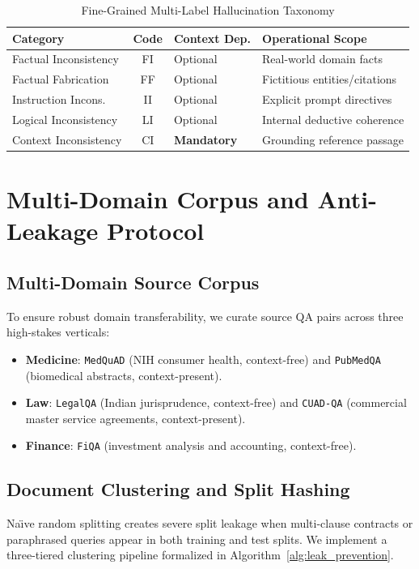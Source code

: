 \documentclass[conference]{IEEEtran}
\begin{document}
\begin{table}[!t]
\caption{Fine-Grained Multi-Label Hallucination Taxonomy}
\label{tab:taxonomy}
\centering
\footnotesize
\setlength{\tabcolsep}{3pt}
\renewcommand{\arraystretch}{1.15}
\begin{tabularx}{\columnwidth}{@{}lcLL@{}}
\toprule
\textbf{Category} & \textbf{Code} & \textbf{Context Dep.} & \textbf{Operational Scope} \\
\midrule
Factual Inconsistency & FI & Optional & Real-world domain facts \\
Factual Fabrication   & FF & Optional & Fictitious entities/citations \\
Instruction Incons.   & II & Optional & Explicit prompt directives \\
Logical Inconsistency & LI & Optional & Internal deductive coherence \\
Context Inconsistency & CI & \textbf{Mandatory} & Grounding reference passage \\
\bottomrule
\end{tabularx}
\end{table}

\section{Multi-Domain Corpus and Anti-Leakage Protocol}
\label{sec:corpus}

\subsection{Multi-Domain Source Corpus}
To ensure robust domain transferability, we curate source QA pairs across three high-stakes verticals:
\begin{itemize}
    \item \textbf{Medicine}: \texttt{MedQuAD} \cite{benabacha2019medquad} (NIH consumer health, context-free) and \texttt{PubMedQA} \cite{jin2019pubmedqa} (biomedical abstracts, context-present).
    \item \textbf{Law}: \texttt{LegalQA} (Indian jurisprudence, context-free) and \texttt{CUAD-QA} \cite{hendrycks2021cuad} (commercial master service agreements, context-present).
    \item \textbf{Finance}: \texttt{FiQA} \cite{maia2018fiqa} (investment analysis and accounting, context-free).
\end{itemize}

\subsection{Document Clustering and Split Hashing}
Na\"\i ve random splitting creates severe split leakage when multi-clause contracts or paraphrased queries appear in both training and test splits. We implement a three-tiered clustering pipeline formalized in Algorithm~\ref{alg:leak_prevention}.
\end{document}
